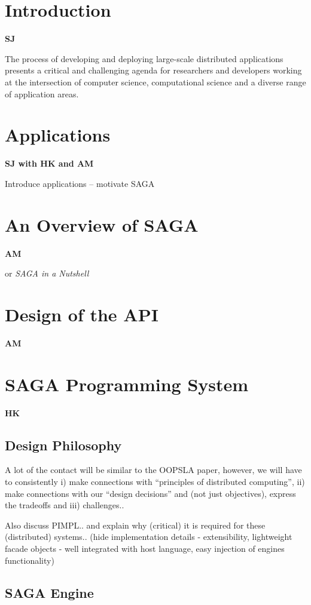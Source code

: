 \documentclass[10pt,letterpaper]{article}
\begin{document}
\section{Introduction} {\bf SJ}

The process of developing and deploying large-scale distributed
applications presents a critical and challenging agenda for
researchers and developers working at the intersection of computer
science, computational science and a diverse range of application
areas. 

\section{Applications}\label{application}{\bf SJ with HK and AM}

Introduce applications -- motivate SAGA

\section{An Overview of SAGA} {\bf AM}

or {\it SAGA in a Nutshell}

\section{Design of the API} {\bf AM}

\section{SAGA Programming System} {\bf HK}

\subsection{Design Philosophy}

A lot of the contact will be similar to the OOPSLA paper, however, we
will have to consistently i) make connections with ``principles of
distributed computing'', ii) make connections with our ``design
decisions'' and (not just objectives), express the tradeoffs and iii)
challenges..

Also discuss PIMPL..  and explain why (critical) it is required
for these (distributed) systems.. (hide implementation details - extensibility,
lightweight facade objects - well integrated with host language,
easy injection of engines functionality)

\subsection{SAGA Engine}
\end{document}
